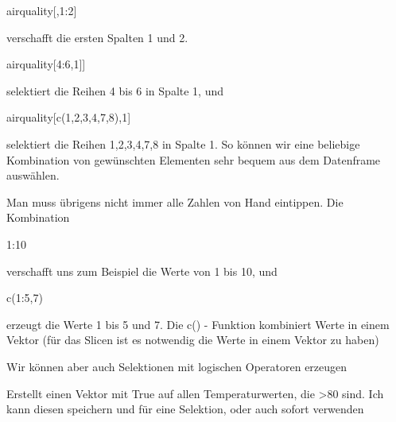 \documentclass[a4paper,twoside]{tufte-book}\usepackage[]{graphicx}\usepackage[]{color}
\begin{document}
\begin{appendices}
\begin{Schunk}
\begin{Sinput}
airquality[,1:2]
\end{Sinput}
\end{Schunk}

verschafft die ersten Spalten 1 und 2.


\begin{Schunk}
\begin{Sinput}
airquality[4:6,1]]
\end{Sinput}
\end{Schunk}

selektiert die Reihen 4 bis 6 in Spalte 1, und


\begin{Schunk}
\begin{Sinput}
airquality[c(1,2,3,4,7,8),1]
\end{Sinput}
\end{Schunk}

selektiert die Reihen 1,2,3,4,7,8 in Spalte 1. So können wir eine beliebige Kombination von gewünschten Elementen sehr bequem aus dem Datenframe auswählen. 

Man muss übrigens nicht immer alle Zahlen von Hand eintippen. Die Kombination 

\begin{Schunk}
\begin{Sinput}
1:10
\end{Sinput}
\end{Schunk}

verschafft uns zum Beispiel die Werte von 1 bis 10, und

\begin{Schunk}
\begin{Sinput}
c(1:5,7)
\end{Sinput}
\end{Schunk}

erzeugt die Werte 1 bis 5 und 7. Die c() - Funktion kombiniert Werte in einem Vektor (für das Slicen ist es notwendig die Werte in einem Vektor zu haben)

Wir können aber auch Selektionen mit logischen Operatoren erzeugen

\begin{Schunk}
\end{Schunk}

Erstellt einen Vektor mit True auf allen Temperaturwerten, die >80 sind. Ich kann diesen speichern und für eine Selektion, oder auch sofort verwenden


\end{appendices}
\end{document}
